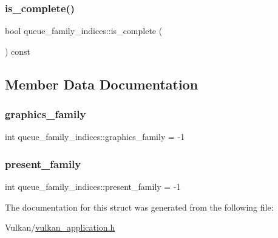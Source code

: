 \subsubsection{\texorpdfstring{is\+\_\+complete()}{is\_complete()}}
{\footnotesize\ttfamily bool queue\+\_\+family\+\_\+indices\+::is\+\_\+complete (\begin{DoxyParamCaption}{ }\end{DoxyParamCaption}) const\hspace{0.3cm}{\ttfamily [inline]}}



\subsection{Member Data Documentation}
\mbox{\label{structqueue__family__indices_a928da87763d74a6cba8a3d5b82355219}} 
\subsubsection{\texorpdfstring{graphics\+\_\+family}{graphics\_family}}
{\footnotesize\ttfamily int queue\+\_\+family\+\_\+indices\+::graphics\+\_\+family = -\/1}

\mbox{\label{structqueue__family__indices_a208d926bd52d24f53ad5a8116e2f2d67}} 
\subsubsection{\texorpdfstring{present\+\_\+family}{present\_family}}
{\footnotesize\ttfamily int queue\+\_\+family\+\_\+indices\+::present\+\_\+family = -\/1}



The documentation for this struct was generated from the following file\+:\begin{DoxyCompactItemize}
\item 
Vulkan/\mbox{\hyperlink{vulkan__application_8h}{vulkan\+\_\+application.\+h}}\end{DoxyCompactItemize}
